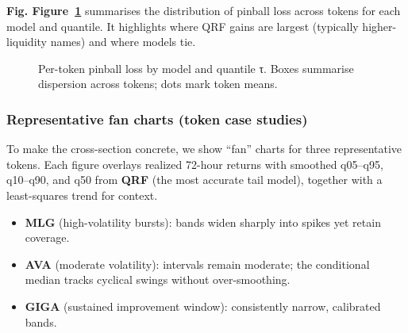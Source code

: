 \documentclass[
  a4paper,
  DIV=11,
  numbers=noendperiod]{scrreprt}
\providecommand{\tightlist}{%
  \setlength{\itemsep}{0pt}\setlength{\parskip}{0pt}}
\begin{document}
\textbf{Fig. Figure~\ref{fig-pinball-by-token}} summarises the
distribution of pinball loss across tokens for each model and quantile.
It highlights where QRF gains are largest (typically higher-liquidity
names) and where models tie.

\begin{figure}


\caption{\label{fig-pinball-by-token}Per-token pinball loss by model and
quantile τ. Boxes summarise dispersion across tokens; dots mark token
means.}

\end{figure}%

\subsubsection{Representative fan charts (token case
studies)}\label{representative-fan-charts-token-case-studies}

To make the cross-section concrete, we show ``fan'' charts for three
representative tokens. Each figure overlays realized 72-hour returns
with smoothed q05--q95, q10--q90, and q50 from \textbf{QRF} (the most
accurate tail model), together with a least-squares trend for context.

\begin{itemize}
\tightlist
\item
  \textbf{MLG} (high-volatility bursts): bands widen sharply into spikes
  yet retain coverage.
\item
  \textbf{AVA} (moderate volatility): intervals remain moderate; the
  conditional median tracks cyclical swings without over-smoothing.
\item
  \textbf{GIGA} (sustained improvement window): consistently narrow,
  calibrated bands.
\end{itemize}
\end{document}
